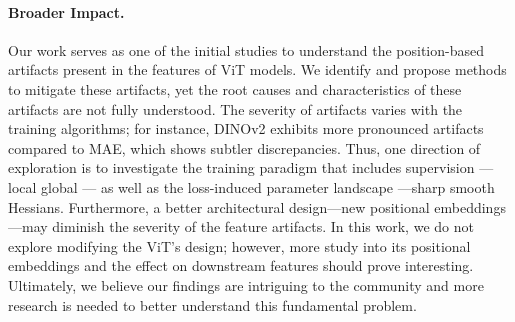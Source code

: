 \paragraph{Broader Impact.} Our work serves as one of the initial studies to understand the position-based artifacts present in the features of ViT models. We identify and propose methods to mitigate these artifacts, yet the root causes and characteristics of these artifacts are not fully understood. The severity of artifacts varies with the training algorithms; for instance, DINOv2 exhibits more pronounced artifacts compared to MAE, which shows subtler discrepancies.
Thus, one direction of exploration is to investigate the training paradigm that includes supervision ---\ie local \vs global --- as well as the loss-induced parameter landscape ---\ie sharp \vs smooth Hessians.
Furthermore, a better architectural design---\eg new positional embeddings---may diminish the severity of the feature artifacts. In this work, we do not explore modifying the ViT's design; however, more study into its positional embeddings and the effect on downstream features should prove interesting.
Ultimately, we believe our findings are intriguing to the community and more research is needed to better understand this fundamental problem.
